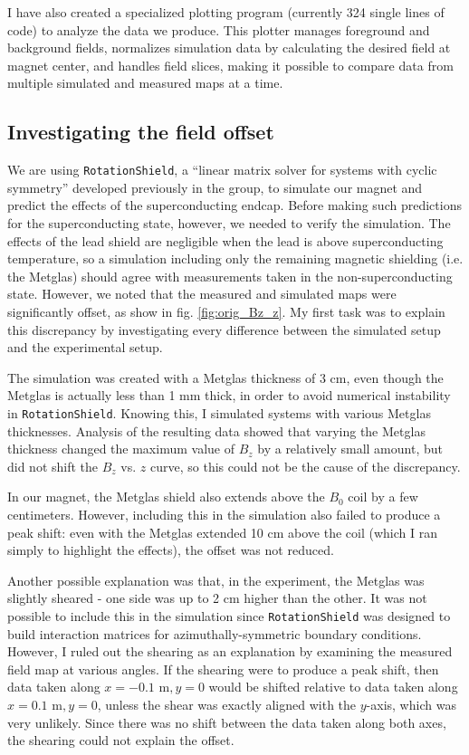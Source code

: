 \documentclass[twocolumn,aps,prb,citeautoscript]{revtex4-1}
\begin{document}
I have also created a specialized plotting program (currently 324 single lines of code) to analyze the data
we produce. This plotter manages foreground and background fields, normalizes simulation
data by calculating the desired field at magnet center, and handles field slices, making it possible to
compare data from multiple simulated and measured maps at a time.

\subsection{Investigating the field offset}

We are using \texttt{RotationShield}, a ``linear matrix solver for systems with cyclic symmetry'' developed previously in the group, \cite{rotshield}
to simulate our magnet and predict the effects of the superconducting endcap. Before making such predictions
for the superconducting state, however, we needed to verify the simulation.
The effects of the lead shield are negligible when the lead is above superconducting temperature, so a simulation
including only the remaining magnetic shielding (i.e. the Metglas) should agree with measurements taken in
the non-superconducting state. However, we noted that the measured and simulated maps were significantly offset,
as show in fig. \ref{fig:orig_Bz_z}. My first task was to explain this discrepancy by investigating every
difference between the simulated setup and the experimental setup.

The simulation was created with a Metglas thickness of 3 cm, even though the Metglas is actually less than 1 mm thick,
in order to avoid numerical instability in \texttt{RotationShield}. Knowing this, I simulated systems with various
Metglas thicknesses. Analysis of the resulting data showed that varying the Metglas thickness
changed the maximum value
of $B_z$ by a relatively small amount, but did not shift the $B_z$ vs. $z$ curve, so this could not be the cause of
the discrepancy.

In our magnet, the Metglas shield also extends above the $B_0$ coil by a few centimeters. However, including this
in the simulation also failed to produce a peak shift: even with the Metglas extended 10 cm above the coil (which
I ran simply to highlight the effects), the offset was not reduced.

Another possible explanation was that, in the experiment, the Metglas was slightly sheared - one side was up to
2 cm higher than the other. It was not possible to include this in the simulation since \texttt{RotationShield} was
designed to build interaction matrices for azimuthally-symmetric boundary conditions. However, I ruled out the
shearing as an explanation by examining the measured field map at various angles. If the shearing were to
produce a peak shift, then data taken along $x = -0.1 \text{ m}, y = 0$ would be shifted relative to data
taken along $x = 0.1 \text{ m}, y = 0$, unless the shear was exactly aligned with the $y$-axis, which was
very unlikely.
Since there was no shift between the data taken along both axes, the shearing could not explain the offset.
\end{document}

